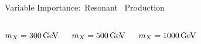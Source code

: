\documentclass[11pt, xcolor={dvipsnames}, aspectratio=169]{beamer}
\begin{document}
\begin{frame}{Variable Importance:\ Resonant~\allbold{\HH} Production}

  \begin{columns}
    \centering\footnotesize

    $\mX = \SI{300}{\GeV}$

    \vspace*{1em}

    

    \centering\footnotesize

    $\mX = \SI{500}{\GeV}$

    \vspace*{1em}

    

    \centering\footnotesize

    $\mX = \SI{1000}{\GeV}$

    \vspace*{1em}

    
  \end{columns}
\end{frame}

\end{document}
